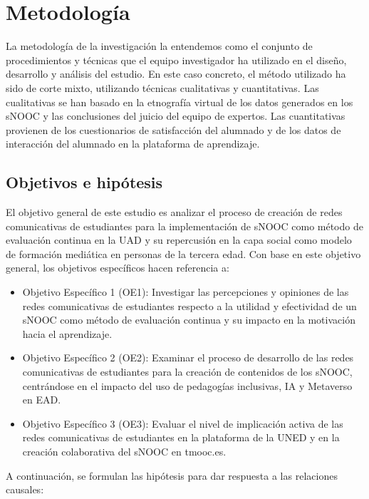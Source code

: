 
\section{Metodología}\label{sec-metodología}

La metodología de la investigación la entendemos como el conjunto de
procedimientos y técnicas que el equipo investigador ha utilizado en el
diseño, desarrollo y análisis del estudio. En este caso concreto, el
método utilizado ha sido de corte mixto, utilizando técnicas
cualitativas y cuantitativas. Las cualitativas se han basado en la
etnografía virtual de los datos generados en los sNOOC y las
conclusiones del juicio del equipo de expertos. Las cuantitativas
provienen de los cuestionarios de satisfacción del alumnado y de los
datos de interacción del alumnado en la plataforma de aprendizaje.


\subsection{Objetivos e hipótesis}\label{sub-sec-objetivosehipotesis}

El objetivo general de este estudio es analizar el proceso de creación
de redes comunicativas de estudiantes para la implementación de sNOOC
como método de evaluación continua en la UAD y su repercusión en la capa
social como modelo de formación mediática en personas de la tercera
edad. Con base en este objetivo general, los objetivos específicos hacen
referencia a:

\begin{itemize}
\item
Objetivo Específico 1 (OE1): Investigar las percepciones y opiniones
de las redes comunicativas de estudiantes respecto a la utilidad y
efectividad de un sNOOC como método de evaluación continua y su
impacto en la motivación hacia el aprendizaje.
\item
Objetivo Específico 2 (OE2): Examinar el proceso de desarrollo de las
redes comunicativas de estudiantes para la creación de contenidos de
los sNOOC, centrándose en el impacto del uso de pedagogías inclusivas,
IA y Metaverso en EAD.
\item
Objetivo Específico 3 (OE3): Evaluar el nivel de implicación activa de
las redes comunicativas de estudiantes en la plataforma de la UNED y
en la creación colaborativa del sNOOC en tmooc.es.
\end{itemize}

A continuación, se formulan las hipótesis para dar respuesta a las
relaciones causales:

